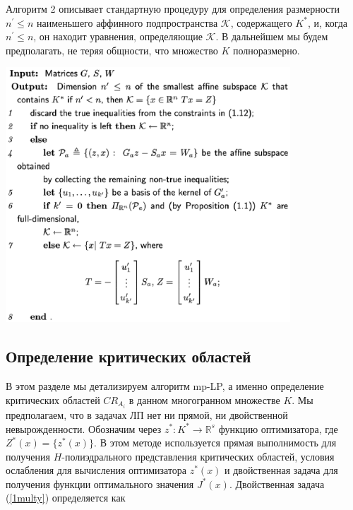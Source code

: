 \bigskip
Алгоритм 2 описывает стандартную процедуру для определения размерности $n^{'} \leq n$ наименьшего аффинного подпространства $\mathcal{K}$, содержащего $K^*$, и, когда $n^{'} \leq n$, он находит уравнения, определяющие $\mathcal{K}$. В дальнейшем мы будем предполагать, не теряя общности, что множество $K$ полноразмерно.
\bigskip

\begin{algorithm}[H]
    \SetAlgoLined
    \includegraphics[width=0.8\textwidth]{algorythm2.eps}
     \caption{}
\end{algorithm}


\subsection{Определение критических областей}\label{critical-regions}

В этом разделе мы детализируем алгоритм mp-LP, а именно определение критических областей $CR_{A_i}$ в данном многогранном множестве $K$. Мы предполагаем, что в задачах ЛП нет ни прямой, ни двойственной невырожденности. Обозначим через $z^*: K^* \to \mathbb{R}^s$ функцию оптимизатора, где $Z^* (x) = \{z^* (x)\}$. В этом методе используется прямая выполнимость для получения $H$-полиэдрального представления критических областей, условия ослабления для вычисления оптимизатора $z^* (x)$ и двойственная задача для получения функции оптимального значения $J^* (x)$. Двойственная задача (\ref{1multy}) определяется как

